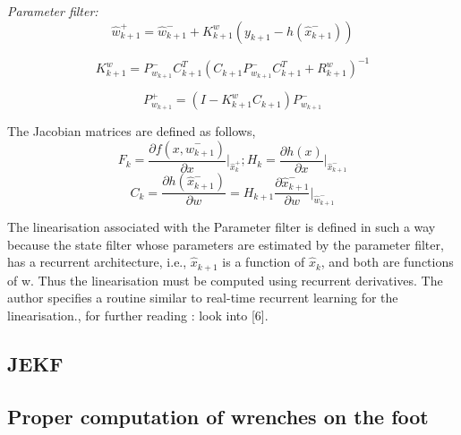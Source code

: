 \documentclass[letterpaper, 10pt, conference]{ieeeconf}      %
\begin{document}
\textit{Parameter filter:}
$$\hat{w}_{k+1}^{+} = \hat{w}_{k+1}^{-} + K^{w}_{k+1}(y_{k+1} - h(\hat{x}_{k+1}^{-})) $$

$$K^{w}_{k+1} = P_{w_{k+1}}^{-}C_{k+1}^{T}(C_{k+1}P_{w_{k+1}}^{-}C_{k+1}^{T} + R_{k+1}^{w})^{-1} $$

$$P_{w_{k+1}}^{+} = (I-K^{w}_{k+1}C_{k+1})P_{w_{k+1}}^{-}$$

The Jacobian matrices are defined as follows,
$$F_{k} = \frac{\partial f(x,\hat{w}_{k+1}^{-})}{\partial x}\bigg|_{\hat{x}_{k}^{+}} ; H_{k} = \frac{\partial h(x)}{\partial x}\bigg|_{\hat{x}_{k+1}^{-}} $$
$$ C_{k} = \frac{\partial h(\hat{x}_{k+1}^{-})}{\partial w} = H_{k+1}\frac{\partial \hat{x}_{k+1}^{-}}{\partial w}\bigg|_{\hat{w}_{k+1}^{-}} $$
\linebreak

The linearisation associated with the Parameter filter is defined in such a way because the state filter whose parameters are estimated by the parameter filter, has a recurrent architecture, i.e., $\hat{x}_{k+1}$ is a function of $\hat{x}_{k}$, and both are functions of w. Thus the linearisation must be computed using recurrent derivatives. The author specifies a routine similar to real-time recurrent learning for the linearisation., for further reading : look into [6]. 
%

\subsection{JEKF}

\subsection{Proper computation of wrenches on the foot}
\end{document}

